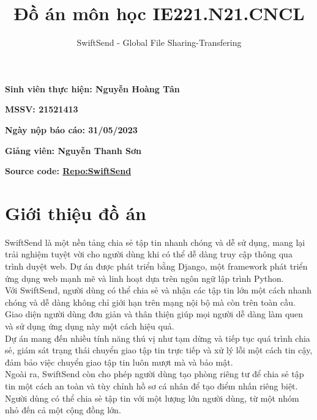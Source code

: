 \documentclass[paper=a4wide, fontsize=12pt]{scrartcl}	 %
\title{\vspace{-1.8cm}  \color{DarkRed}  Đồ án môn học IE221.N21.CNCL}
\subtitle{SwiftSend - Global File Sharing-Transfering %
\vspace{-2cm} }
\date{} %
\begin{document}
\maketitle %
\thispagestyle{fancy} %


\vspace{-0.5cm} \textbf{Sinh viên thực hiện: Nguyễn Hoàng Tân}

\textbf{MSSV: 21521413}

\textbf{Ngày nộp báo cáo: 31/05/2023}

\textbf{Giảng viên: Nguyễn Thanh Sơn}

\textbf{Source code: \href{https://github.com/Dev-Aligator/SwiftSend-Web}{Repo:SwiftSend}}





\vspace{0.5cm}

\section{Giới thiệu đồ án}

SwiftSend là một nền tảng chia sẻ tập tin nhanh chóng và dễ sử dụng, mang lại trải nghiệm tuyệt vời cho người dùng khi có thể dễ dàng truy cập thông qua trình duyệt web. Dự án được phát triển bằng Django, một framework phát triển ứng dụng web mạnh mẽ và linh hoạt dựa trên ngôn ngữ lập trình Python. \\

Với SwiftSend, người dùng có thể chia sẻ và nhận các tập tin lớn một cách nhanh chóng và dễ dàng không chỉ giới hạn trên mạng nội bộ mà còn trên toàn cầu. Giao diện người dùng đơn giản và thân thiện giúp mọi người dễ dàng làm quen và sử dụng ứng dụng này một cách hiệu quả. \\

Dự án mang đến nhiều tính năng thú vị như tạm dừng và tiếp tục quá trình chia sẻ, giám sát trạng thái chuyển giao tập tin trực tiếp và xử lý lỗi một cách tin cậy, đảm bảo việc chuyển giao tập tin luôn mượt mà và bảo mật. \\

Ngoài ra, SwiftSend còn cho phép người dùng tạo phòng riêng tư để chia sẻ tập tin một cách an toàn và tùy chỉnh hồ sơ cá nhân để tạo điểm nhấn riêng biệt. Người dùng có thể chia sẻ tập tin với một lượng lớn người dùng, từ một nhóm nhỏ đến cả một cộng đồng lớn. \\
\end{document}
